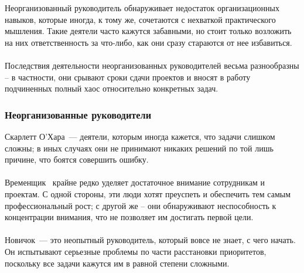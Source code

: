 \documentclass{../industrial-development}
\begin{document}
{\begin{frame}
\begin{itemize}
	\end{itemize}
\end{frame}
\lecturenotes
Неорганизованный руководитель обнаруживает недостаток организационных навыков, которые иногда, к тому же, сочетаются с нехваткой практического мышления. Такие деятели часто кажутся забавными, но стоит только возложить на них ответственность за что-либо, как они сразу стараются от нее избавиться. \\~\\
Последствия деятельности неорганизованных руководителей весьма разнообразны – в частности, они срывают сроки сдачи проектов и вносят в работу подчиненных полный хаос относительно конкретных задач. \\


\begin{frame} \frametitle{Неорганизованные руководители}
	 \alert{Скарлетт О'Хара}~— деятели, которым иногда кажется, что задачи слишком сложны; в иных случаях они не принимают никаких решений по той лишь причине, что боятся совершить ошибку.\\~\\
\alert{Временщик}~ крайне редко уделяет достаточное внимание сотрудникам и проектам. С одной стороны, эти люди хотят преуспеть и обеспечить тем самым профессиональный рост; с другой же – они обнаруживают неспособность к концентрации внимания, что не позволяет им достигать первой цели. 
\\~\\
\alert{Новичок}~— это неопытный руководитель, который вовсе не знает, с чего начать. Он испытывают серьезные проблемы по части расстановки приоритетов, поскольку все задачи кажутся им в равной степени сложными.
\\
\end{frame}
\lecturenotes


}
\end{document}
